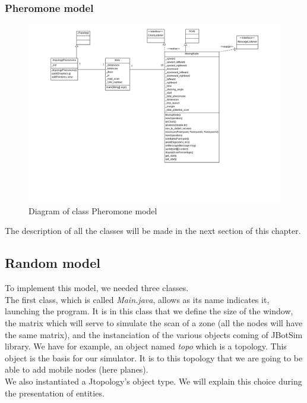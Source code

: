 \newpage

\subsubsection{Pheromone model}

\begin{figure}[h]
\center
\includegraphics[scale=0.6]{../images/DiagrammedeclassesPheromone.png}
\caption{\label{RandomWalkDIA}Diagram of class Pheromone model}
\end{figure}

The description of all the classes will be made in the next section of this chapter.

\newpage

\subsection{Random model} 

To implement this model, we needed three classes.\\
The first class, which is called \textit{Main.java}, allows as its name indicates it, launching the program. It is in this class that we define the size of the window, the matrix which will serve to simulate the scan of a zone (all the nodes will have the same matrix), and the instanciation of the various objects coming of JBotSim library. We have for example, an object named \textit{topo} which is a topology. This object is the basis for our simulator. It is to this topology that we are going to be able to add mobile nodes (here planes).\\

We also instantiated a Jtopology's object type. We will explain this choice during the presentation of entities.\\

